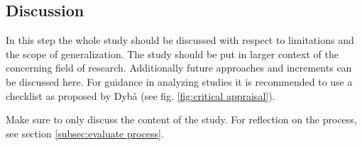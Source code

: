 
\subsection{Discussion}
\label{subsec:discussion}

In this step the whole study should be discussed with respect to limitations and the scope of generalization. The study should be put in larger context of the concerning field of research. Additionally future approaches and increments can be discussed here. For guidance in analyzing studies it is recommended to use a checklist as proposed by Dyb{\aa} \etal (see fig. \ref{fig:critical appraisal}).

Make sure to only discuss the content of the study. For reflection on the process, see section \ref{subsec:evaluate process}.